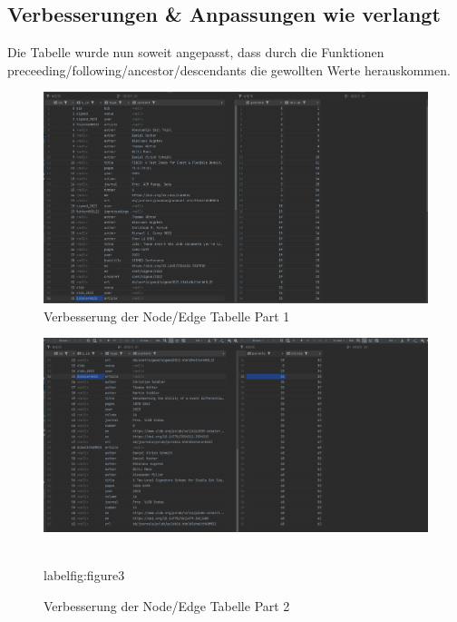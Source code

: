 \documentclass[11pt]{scrartcl}
\begin{document}
\subsection*{Verbesserungen & Anpassungen wie verlangt}
Die Tabelle wurde nun soweit angepasst, dass durch die Funktionen preceeding/following/ancestor/descendants die gewollten Werte herauskommen.
\begin{figure}[H]
    \includegraphics[width=\linewidth]{Verbesserung_Node_Edge_Table.png}
    \caption{Verbesserung der Node/Edge Tabelle Part 1}\label{fig:figure2}
\end{figure}
\begin{figure}[H]
    \includegraphics[width=\linewidth]{Verbesserung_Node_Edge_Table_P2.png}
    \caption{Verbesserung der Node/Edge Tabelle Part 2}\\label{fig:figure3}
\end{figure}
\end{document}
